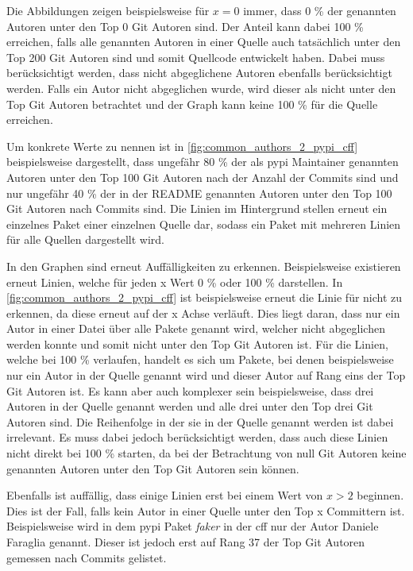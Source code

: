 Die Abbildungen zeigen beispielsweise für $x=0$ immer, dass 0 \% der genannten Autoren unter den Top 0 Git Autoren sind.
Der Anteil kann dabei 100 \% erreichen, falls alle genannten Autoren in einer Quelle auch tatsächlich unter den Top 200 Git Autoren sind und somit Quellcode entwickelt haben.
Dabei muss berücksichtigt werden, dass nicht abgeglichene Autoren ebenfalls berücksichtigt werden.
Falls ein Autor nicht abgeglichen wurde, wird dieser als nicht unter den Top Git Autoren betrachtet und der Graph kann keine 100 \% für die Quelle erreichen.

Um konkrete Werte zu nennen ist in \autoref{fig:common_authors_2_pypi_cff} beispielsweise dargestellt, dass ungefähr 80 \% der als \gls{pypi} Maintainer genannten Autoren unter den Top 100 Git Autoren nach der Anzahl der Commits sind und nur ungefähr 40 \% der in der README genannten Autoren unter den Top 100 Git Autoren nach Commits sind.
Die Linien im Hintergrund stellen erneut ein einzelnes Paket einer einzelnen Quelle dar, sodass ein Paket mit mehreren Linien für alle Quellen dargestellt wird.

In den Graphen sind erneut Auffälligkeiten zu erkennen.
Beispielsweise existieren erneut Linien, welche für jeden x Wert 0 \% oder 100 \% darstellen.
In \autoref{fig:common_authors_2_pypi_cff} ist beispielsweise erneut die Linie für  nicht zu erkennen, da diese erneut auf der x Achse verläuft.
Dies liegt daran, dass nur ein Autor in einer  Datei über alle Pakete genannt wird, welcher nicht abgeglichen werden konnte und somit nicht unter den Top Git Autoren ist.
Für die Linien, welche bei 100 \% verlaufen, handelt es sich um Pakete, bei denen beispielsweise nur ein Autor in der Quelle genannt wird und dieser Autor auf Rang eins der Top Git Autoren ist.
Es kann aber auch komplexer sein beispielsweise, dass drei Autoren in der Quelle genannt werden und alle drei unter den Top drei Git Autoren sind.
Die Reihenfolge in der sie in der Quelle genannt werden ist dabei irrelevant.
Es muss dabei jedoch berücksichtigt werden, dass auch diese Linien nicht direkt bei 100 \% starten, da bei der Betrachtung von null Git Autoren keine genannten Autoren unter den Top Git Autoren sein können.

Ebenfalls ist auffällig, dass einige Linien erst bei einem Wert von $x>2$ beginnen.
Dies ist der Fall, falls kein Autor in einer Quelle unter den Top x Committern ist.
Beispielsweise wird in dem \gls{pypi} Paket \emph{faker} in der \gls{cff} nur der Autor \glqq Daniele Faraglia\grqq{} genannt.
Dieser ist jedoch erst auf Rang 37 der Top Git Autoren gemessen nach Commits gelistet.

